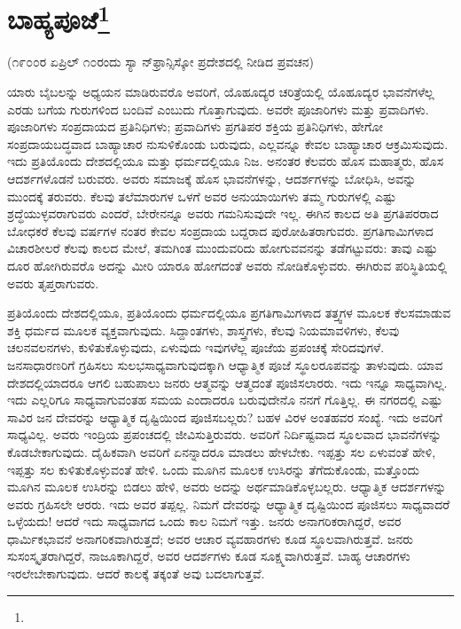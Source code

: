 
\chapter{ಬಾಹ್ಯಪೂಜೆ\protect\footnote{}}

\begin{center}
(೧೯೦೦ರ ಏಪ್ರಿಲ್ ೧೦ರಂದು ಸ್ಯಾ ನ್‌ಫ್ರಾನ್ಸಿಸ್ಕೋ ಪ್ರದೇಶದಲ್ಲಿ ನೀಡಿದ ಪ್ರವಚನ)
\end{center}

ಯಾರು ಬೈಬಲನ್ನು ಅಧ್ಯಯನ ಮಾಡಿರುವರೊ ಅವರಿಗೆ, ಯೊಹೂದ್ಯರ ಚರಿತ್ರೆಯಲ್ಲಿ ಯೊಹೂದ್ಯರ ಭಾವನೆಗಳೆಲ್ಲ ಎರಡು ಬಗೆಯ ಗುರುಗಳಿಂದ ಬಂದಿವೆ ಎಂಬುದು ಗೊತ್ತಾಗುವುದು. ಅವರೇ ಪೂಜಾರಿಗಳು ಮತ್ತು ಪ್ರವಾದಿಗಳು. ಪೂಜಾರಿಗಳು ಸಂಪ್ರದಾಯದ ಪ್ರತಿನಿಧಿಗಳು; ಪ್ರವಾದಿಗಳು ಪ್ರಗತಿಪರ ಶಕ್ತಿಯ ಪ್ರತಿನಿಧಿಗಳು, ಹೇಗೋ ಸಂಪ್ರದಾಯಬದ್ಧವಾದ ಬಾಹ್ಯಾಚಾರ ನುಸುಳಿಕೊಂಡು ಬರುವುದು, ಎಲ್ಲವನ್ನೂ ಕೇವಲ ಬಾಹ್ಯಾಚಾರ ಆಕ್ರಮಿಸುವುದು. ಇದು ಪ್ರತಿಯೊಂದು ದೇಶದಲ್ಲಿಯೂ ಮತ್ತು ಧರ್ಮದಲ್ಲಿಯೂ ನಿಜ. ಅನಂತರ ಕೆಲವರು ಹೊಸ ಮಹಾತ್ಮರು, ಹೊಸ ಆದರ್ಶಗಳೊಡನೆ ಬರುವರು. ಅವರು ಸಮಾಜಕ್ಕೆ ಹೊಸ ಭಾವನೆಗಳನ್ನು, ಆದರ್ಶಗಳನ್ನು ಬೋಧಿಸಿ, ಅವನ್ನು ಮುಂದಕ್ಕೆ ತರುವರು. ಕೆಲವು ತಲೆಮಾರುಗಳ ಒಳಗೆ ಅವರ ಅನುಯಾಯಿಗಳು ತಮ್ಮ ಗುರುಗಳಲ್ಲಿ ಎಷ್ಟು ಶ್ರದ್ಧೆಯುಳ್ಳವರಾಗುವರು ಎಂದರೆ, ಬೇರೇನನ್ನೂ ಅವರು ಗಮನಿಸುವುದೇ ಇಲ್ಲ. ಈಗಿನ ಕಾಲದ ಅತಿ ಪ್ರಗತಿಪರರಾದ ಬೋಧಕರೆ ಕೆಲವು ವರ್ಷಗಳ ನಂತರ ಕೇವಲ ಸಂಪ್ರದಾಯ ಬದ್ದರಾದ ಪುರೋಹಿತರಾಗುವರು. ಪ್ರಗತಿಗಾಮಿಗಳಾದ ವಿಚಾರಶೀಲರೆ ಕೆಲವು ಕಾಲದ ಮೇಲೆ, ತಮಗಿಂತ ಮುಂದುವರಿದು ಹೋಗುವವನನ್ನು ತಡೆಗಟ್ಟುವರು: ತಾವು ಎಷ್ಟು ದೂರ ಹೋಗಿರುವರೊ ಅದನ್ನು ಮೀರಿ ಯಾರೂ ಹೋಗದಂತೆ ಅವರು ನೋಡಿಕೊಳ್ಳುವರು. ಈಗಿರುವ ಪರಿಸ್ಥಿತಿಯಲ್ಲಿ ಅವರು ತೃಪ್ತರಾಗುವರು.

ಪ್ರತಿಯೊಂದು ದೇಶದಲ್ಲಿಯೂ, ಪ್ರತಿಯೊಂದು ಧರ್ಮದಲ್ಲಿಯೂ ಪ್ರಗತಿಗಾಮಿಗಳಾದ ತತ್ತ್ವಗಳ ಮೂಲಕ ಕೆಲಸಮಾಡುವ ಶಕ್ತಿ ಧರ್ಮದ ಮೂಲಕ ವ್ಯಕ್ತವಾಗುವುದು. ಸಿದ್ದಾಂತಗಳು, ಶಾಸ್ತ್ರಗಳು, ಕೆಲವು ನಿಯಮಾವಳಿಗಳು, ಕೆಲವು ಚಲನವಲನಗಳು, ಕುಳಿತುಕೊಳ್ಳುವುದು, ಏಳುವುದು ಇವುಗಳೆಲ್ಲ ಪೂಜೆಯ ಪ್ರಪಂಚಕ್ಕೆ ಸೇರಿದವುಗಳೆ. ಜನಸಾಧಾರಣರಿಗೆ ಗ್ರಹಿಸಲು ಸುಲಭಸಾಧ್ಯವಾಗುವುದಕ್ಕಾಗಿ ಆಧ್ಯಾತ್ಮಿಕ ಪೂಜೆ ಸ್ಥೂಲರೂಪವನ್ನು ತಾಳುವುದು. ಯಾವ ದೇಶದಲ್ಲಿಯಾದರೂ ಆಗಲಿ ಬಹುಪಾಲು ಜನರು ಆತ್ಮವನ್ನು ಆತ್ಮದಂತೆ ಪೂಜಿಸಲಾರರು. ಇದು ಇನ್ನೂ ಸಾಧ್ಯವಾಗಿಲ್ಲ. ಇದು ಎಲ್ಲರಿಗೂ ಸಾಧ್ಯವಾಗುವಂತಹ ಸಮಯ ಎಂದಾದರೂ ಬರುವುದೇನೊ ನನಗೆ ಗೊತ್ತಿಲ್ಲ. ಈ ನಗರದಲ್ಲಿ ಎಷ್ಟು ಸಾವಿರ ಜನ ದೇವರನ್ನು ಆಧ್ಯಾತ್ಮಿಕ ದೃಷ್ಟಿಯಿಂದ ಪೂಜಿಸಬಲ್ಲರು? ಬಹಳ ವಿರಳ ಅಂತಹವರ ಸಂಖ್ಯೆ. ಇದು ಅವರಿಗೆ ಸಾಧ್ಯವಿಲ್ಲ. ಅವರು ಇಂದ್ರಿಯ ಪ್ರಪಂಚದಲ್ಲಿ ಜೀವಿಸುತ್ತಿರುವರು. ಅವರಿಗೆ ನಿರ್ದಿಷ್ಟವಾದ ಸ್ಥೂಲವಾದ ಭಾವನೆಗಳನ್ನು ಕೊಡಬೇಕಾಗುವುದು. ದೈಹಿಕವಾಗಿ ಅವರಿಗೆ ಏನನ್ನಾದರೂ ಮಾಡಲು ಹೇಳಬೇಕು. ಇಪ್ಪತ್ತು ಸಲ ಏಳುವಂತೆ ಹೇಳಿ, ಇಪ್ಪತ್ತು ಸಲ ಕುಳಿತುಕೊಳ್ಳುವಂತೆ ಹೇಳಿ. ಒಂದು ಮೂಗಿನ ಮೂಲಕ ಉಸಿರನ್ನು ತೆಗೆದುಕೊಂಡು, ಮತ್ತೊಂದು ಮೂಗಿನ ಮೂಲಕ ಉಸಿರನ್ನು ಬಿಡಲು ಹೇಳಿ, ಅವರು ಅದನ್ನು ಅರ್ಥಮಾಡಿಕೊಳ್ಳಬಲ್ಲರು. ಆಧ್ಯಾತ್ಮಿಕ ಆದರ್ಶಗಳನ್ನು ಅವರು ಗ್ರಹಿಸಲೇ ಆರರು. ಇದು ಅವರ ತಪ್ಪಲ್ಲ. ನಿಮಗೆ ದೇವರನ್ನು ಆಧ್ಯಾತ್ಮಿಕ ದೃಷ್ಟಿಯಿಂದ ಪೂಜಿಸಲು ಸಾಧ್ಯವಾದರೆ ಒಳ್ಳೆಯದು! ಆದರೆ ಇದು ಸಾಧ್ಯವಾಗದ ಒಂದು ಕಾಲ ನಿಮಗೆ ಇತ್ತು. ಜನರು ಅನಾಗರಿಕರಾಗಿದ್ದರೆ, ಅವರ ಧಾರ್ಮಿಕಭಾವನೆ ಅನಾಗರಿಕವಾಗಿರುತ್ತದೆ; ಅವರ ಆಚಾರ ವ್ಯವಹಾರಗಳು ಕೂಡ ಸ್ಥೂಲವಾಗಿರುತ್ತವೆ. ಜನರು ಸುಸಂಸ್ಕೃತರಾಗಿದ್ದರೆ, ನಾಜೂಕಾಗಿದ್ದರೆ, ಅವರ ಆದರ್ಶಗಳು ಕೂಡ ಸೂಕ್ಷ್ಮವಾಗಿರುತ್ತವೆ. ಬಾಹ್ಯ ಆಚಾರಗಳು ಇರಲೇಬೇಕಾಗುವುದು. ಆದರೆ ಕಾಲಕ್ಕೆ ತಕ್ಕಂತೆ ಅವು ಬದಲಾಗುತ್ತವೆ.

